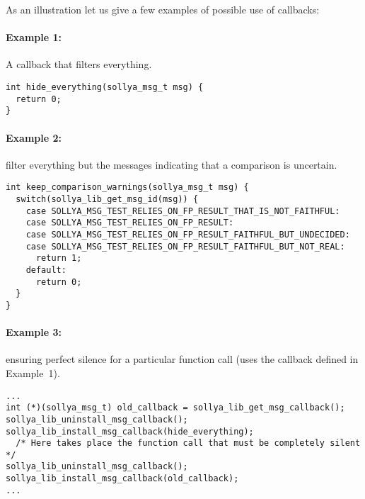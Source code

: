 \documentclass[a4paper]{article}
\begin{document}
As an illustration let us give a few examples of possible use of callbacks:
\paragraph{Example 1:} A callback that filters everything.
\begin{center}
\begin{minipage}{15cm}\begin{Verbatim}[frame=single]
int hide_everything(sollya_msg_t msg) {
  return 0;
}
\end{Verbatim}
\end{minipage}\end{center}

\paragraph{Example 2:} filter everything but the messages indicating that a comparison is uncertain.
\begin{center}
\begin{minipage}{15cm}\begin{Verbatim}[frame=single]
int keep_comparison_warnings(sollya_msg_t msg) {
  switch(sollya_lib_get_msg_id(msg)) {
    case SOLLYA_MSG_TEST_RELIES_ON_FP_RESULT_THAT_IS_NOT_FAITHFUL:
    case SOLLYA_MSG_TEST_RELIES_ON_FP_RESULT:
    case SOLLYA_MSG_TEST_RELIES_ON_FP_RESULT_FAITHFUL_BUT_UNDECIDED:
    case SOLLYA_MSG_TEST_RELIES_ON_FP_RESULT_FAITHFUL_BUT_NOT_REAL:
      return 1;
    default:
      return 0;
  }
}
\end{Verbatim}
\end{minipage}\end{center}

\paragraph{Example 3:} ensuring perfect silence for a particular function call (uses the callback defined in Example~1).
\begin{center}
\begin{minipage}{15cm}\begin{Verbatim}[frame=single]
...
int (*)(sollya_msg_t) old_callback = sollya_lib_get_msg_callback();
sollya_lib_uninstall_msg_callback();
sollya_lib_install_msg_callback(hide_everything);
  /* Here takes place the function call that must be completely silent */
sollya_lib_uninstall_msg_callback();
sollya_lib_install_msg_callback(old_callback);
...
\end{Verbatim}
\end{minipage}\end{center}
\end{document}
